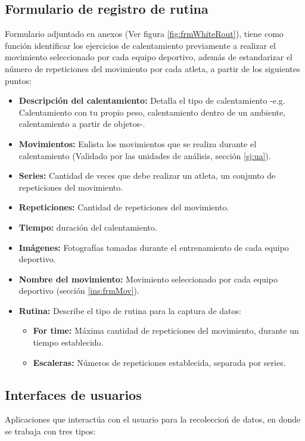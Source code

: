 \subsection{Formulario de registro de rutina} \label{ins:frmRout}
Formulario adjuntado en anexos (Ver figura \ref{fig:frmWhiteRout}), tiene como funci\'on identificar los ejercicios de calentamiento  previamente a realizar el movimiento seleccionado por cada equipo deportivo, adem\'as de estandarizar el n\'umero de repeticiones del movimiento por cada atleta, a partir de los siguientes puntos:
\begin{itemize}
	\item \textbf{Descripci\'on del calentamiento:} Detalla el tipo de calentamiento -e.g. Calentamiento con tu propio peso, calentamiento dentro de un ambiente, calentamiento a partir de objetos-.
	\item \textbf{Movimientos:} Enlista los movimientos que se realiza durante el calentamiento (Validado por las unidades de an\'alisis, secci\'on  \ref{sj:ua}).
	\item \textbf{Series:} Cantidad de veces que debe realizar un atleta, un conjunto de repeticiones del movimiento.
	\item \textbf{Repeticiones:} Cantidad de repeticiones del movimiento.
	\item \textbf{Tiempo:} duraci\'on del calentamiento.
	\item \textbf{Im\'agenes:} Fotograf\'ias tomadas durante el entrenamiento de cada equipo deportivo.
	\item \textbf{Nombre del movimiento:} Movimiento seleccionado por cada equipo deportivo  (secci\'on  \ref{ins:frmMov}).
	\item \textbf{Rutina:} Describe el tipo de rutina para la captura de datos:
	\begin{itemize}
		\item \textbf{For time:} M\'axima cantidad de repeticiones del movimiento, durante un tiempo establecido.
		\item \textbf{Escaleras:} N\'umeros de repeticiones establecida, separada por series.
	\end{itemize}	
\end{itemize}
\subsection{Interfaces de usuarios} \label{ins:UI}
Aplicaciones que interact\'ua con el usuario para la recoleccio\'n de datos, en donde se trabaja con  tres tipos:
